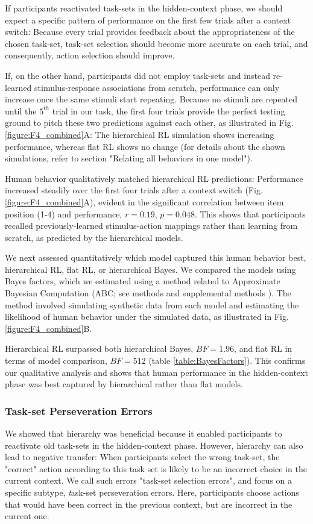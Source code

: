 \documentclass[10pt,letterpaper]{article}  %
\newcommand{\rev}{\color{black}}
\begin{document}
{\rev If participants reactivated task-sets in the hidden-context phase, we should expect a specific pattern of performance on the first few trials after a context switch: Because every trial provides feedback about the appropriateness of the chosen task-set, task-set selection should become more accurate on each trial, and consequently, action selection should improve.

If, on the other hand, participants did not employ task-sets and instead re-learned stimulus-response associations from scratch, performance can only increase once the same stimuli start repeating.
Because no stimuli are repeated until the $5^{th}$ trial in our task, the first four trials provide the perfect testing ground to pitch these two predictions against each other, as illustrated in Fig. \ref{figure:F4_combined}A: The hierarchical RL simulation shows increasing performance, whereas flat RL shows no change (for details about the shown simulations, refer to section "Relating all behaviors in one model").}

{\rev Human behavior qualitatively matched hierarchical RL predictions: Performance increased steadily over the first four trials after a context switch (Fig. \ref{figure:F4_combined}A), evident in the significant correlation between item position (1-4) and performance, $r=0.19$, $p=0.048$. This shows that participants recalled previously-learned stimulus-action mappings rather than learning from scratch, as predicted by the hierarchical models.}

We next assessed quantitatively which model captured this human behavior best, hierarchical RL, flat RL, or hierarchical Bayes.
We compared the models using Bayes factors, which we estimated using a method related to Approximate Bayesian Computation (ABC; see methods and supplemental methods \cite{sunnaker_approximate_2013}). The method involved simulating synthetic data from each model and estimating the likelihood of human behavior under the simulated data, as illustrated in Fig. \ref{figure:F4_combined}B.

Hierarchical RL surpassed both hierarchical Bayes, $BF=1.96$, and flat RL in terms of model comparison, $BF=512$ (table \ref{table:BayesFactors}). This confirms our qualitative analysis and shows that human performance in the hidden-context phase was best captured by hierarchical rather than flat models.

\subsubsection*{Task-set Perseveration Errors}
We showed that hierarchy was beneficial because it enabled participants to reactivate old task-sets in the hidden-context phase. However, hierarchy can also lead to negative transfer: When participants select the wrong task-set, the "correct" action according to this task set is likely to be an incorrect choice in the current context.
We call such errors "task-set selection errors", and focus on a specific subtype, {\textit task-set perseveration errors}. Here, participants choose actions that would have been correct in the previous context, but are incorrect in the current one.
\end{document}
